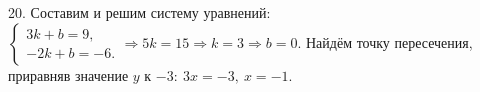 20. Составим и решим систему уравнений: $\begin{cases} 3k+b=9,\\ -2k+b=-6.\end{cases}\Rightarrow 5k=15\Rightarrow k=3\Rightarrow b=0.$ Найдём точку пересечения, приравняв значение $y$ к $-3:\ 3x=-3,\ x=-1.$\\
